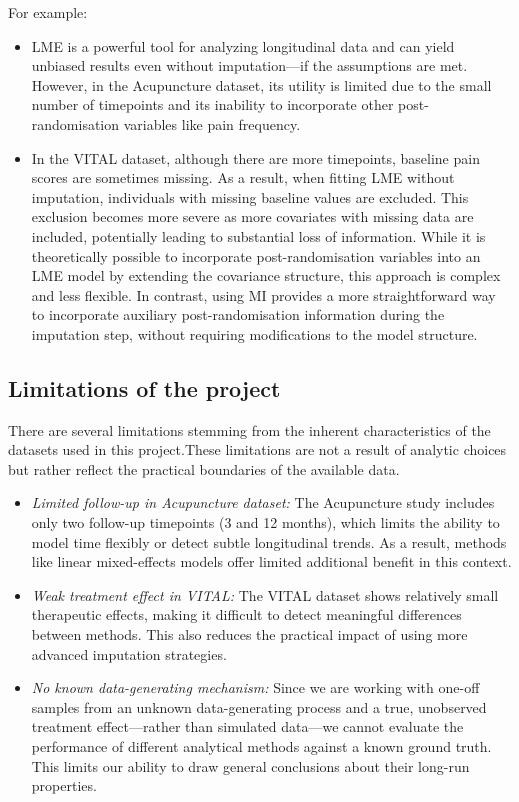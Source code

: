 \documentclass{article}
\begin{document}
For example:

\begin{itemize}
\item
  LME is a powerful tool for analyzing longitudinal data and can yield
  unbiased results even without imputation---if the assumptions are met.
  However, in the Acupuncture dataset, its utility is limited due to the
  small number of timepoints and its inability to incorporate other
  post-randomisation variables like pain frequency.
\item
  In the VITAL dataset, although there are more timepoints, baseline
  pain scores are sometimes missing. As a result, when fitting LME
  without imputation, individuals with missing baseline values are
  excluded. This exclusion becomes more severe as more covariates with
  missing data are included, potentially leading to substantial loss of
  information. While it is theoretically possible to incorporate
  post-randomisation variables into an LME model by extending the
  covariance structure, this approach is complex and less flexible. In
  contrast, using MI provides a more straightforward way to incorporate
  auxiliary post-randomisation information during the imputation step,
  without requiring modifications to the model structure.
\end{itemize}

\subsection{Limitations of the
project}\label{limitations-of-the-project}

There are several limitations stemming from the inherent characteristics
of the datasets used in this project.These limitations are not a result
of analytic choices but rather reflect the practical boundaries of the
available data.

\begin{itemize}
\item
  \emph{Limited follow-up in Acupuncture dataset:} The Acupuncture study
  includes only two follow-up timepoints (3 and 12 months), which limits
  the ability to model time flexibly or detect subtle longitudinal
  trends. As a result, methods like linear mixed-effects models offer
  limited additional benefit in this context.
\item
  \emph{Weak treatment effect in VITAL:} The VITAL dataset shows
  relatively small therapeutic effects, making it difficult to detect
  meaningful differences between methods. This also reduces the
  practical impact of using more advanced imputation strategies.
\item
  \emph{No known data-generating mechanism:} Since we are working with
  one-off samples from an unknown data-generating process and a true,
  unobserved treatment effect---rather than simulated data---we cannot
  evaluate the performance of different analytical methods against a
  known ground truth. This limits our ability to draw general
  conclusions about their long-run properties.
\end{itemize}
\end{document}
